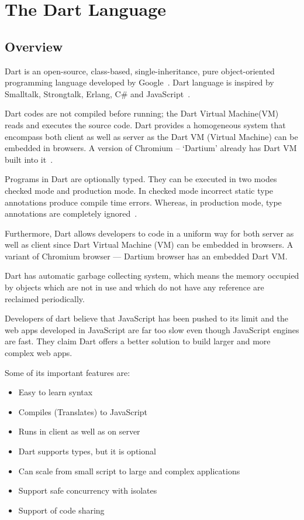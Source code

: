 \section{The Dart Language}
  \subsection{Overview}
  Dart is an open-source, class-based, single-inheritance, pure object-oriented programming language developed by Google~\cite{dartEcma}. Dart language is inspired by Smalltalk, Strongtalk, Erlang, C\# and JavaScript~\cite{sethladd}.

  Dart codes are not compiled before running; the Dart Virtual Machine(VM) reads and executes the source code. Dart provides a homogeneous system that encompass both client as well as server as the Dart VM (Virtual Machine) can be embedded in browsers. A version of Chromium – ‘Dartium’ already has Dart VM built into it~\cite{sethladd}.

  Programs in Dart are optionally typed. They can be executed in two modes checked mode and production mode. In checked mode incorrect static type annotations produce compile time errors. Whereas, in production mode, type annotations are completely ignored~\cite{dartEcma}.

  Furthermore, Dart allows developers to code in a uniform way for both server as well as client since Dart Virtual Machine (VM) can be embedded in browsers. A variant of Chromium browser — Dartium browser has an embedded Dart VM.

  Dart has automatic garbage collecting system, which means the memory occupied by objects which are not in use and which do not have any reference are reclaimed periodically.

  Developers of dart believe that JavaScript has been pushed to its limit and the web apps developed in JavaScript are far too slow even though JavaScript engines are fast. They claim Dart offers a better solution to build larger and more complex web apps\cite{laddWalrath}.

Some of its important features are:
  \begin{itemize}
    \item Easy to learn syntax
    \item Compiles (Translates) to JavaScript
    \item Runs in client as well as on server
    \item Dart supports types, but it is optional
    \item Can scale from small script to large and complex applications
    \item Support safe concurrency with isolates
    \item Support of code sharing
  \end{itemize}

